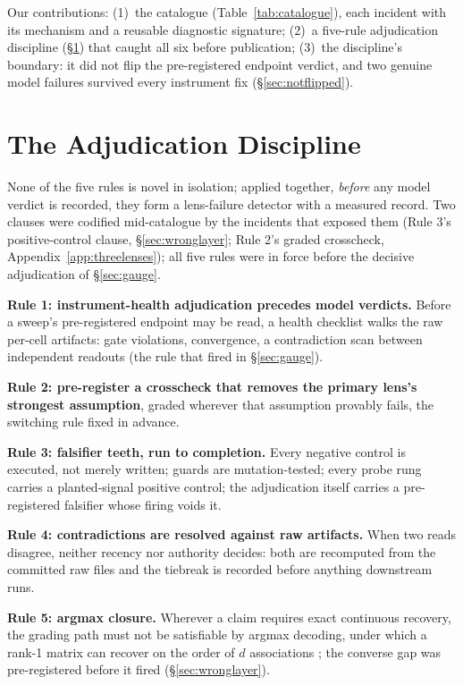 \documentclass{article}
\begin{document}
Our contributions: (1)~the catalogue (Table~\ref{tab:catalogue}), each
incident with its mechanism
and a reusable diagnostic signature; (2)~a five-rule
adjudication discipline (\S\ref{sec:discipline}) that caught all six
before publication; (3)~the discipline's boundary: it did not flip the
pre-registered endpoint verdict, and two genuine model failures
survived every instrument fix (\S\ref{sec:notflipped}).


\section{The Adjudication Discipline}
\label{sec:discipline}

None of the five rules is novel in isolation; applied together,
\emph{before} any model verdict is recorded, they form a lens-failure
detector with a measured record. Two clauses were codified
mid-catalogue by the incidents that exposed them (Rule 3's
positive-control clause, \S\ref{sec:wronglayer}; Rule 2's graded
crosscheck, Appendix~\ref{app:threelenses}); all five rules were in
force before the decisive adjudication of \S\ref{sec:gauge}.

\textbf{Rule 1: instrument-health adjudication precedes model
verdicts.} Before a sweep's pre-registered endpoint may be read, a
health checklist walks the raw per-cell artifacts: gate violations,
convergence, a contradiction scan between independent readouts (the
rule that fired in \S\ref{sec:gauge}).

\textbf{Rule 2: pre-register a crosscheck that removes the primary
lens's strongest assumption}, graded wherever that assumption provably
fails, the switching rule fixed in advance.

\textbf{Rule 3: falsifier teeth, run to completion.} Every negative
control is executed, not merely written; guards are mutation-tested;
every probe rung carries a planted-signal positive control; the
adjudication itself carries a pre-registered falsifier whose firing
voids it.

\textbf{Rule 4: contradictions are resolved against raw artifacts.}
When two reads disagree, neither recency nor authority decides: both
are recomputed from the committed raw files and the tiebreak is
recorded before anything downstream runs.

\textbf{Rule 5: argmax closure.} Wherever a claim requires exact
continuous recovery, the grading path must not be satisfiable by
argmax decoding, under which a rank-1 matrix can recover on the order
of $d$ associations \citep{nichani2025factual}; the converse gap was
pre-registered before it fired (\S\ref{sec:wronglayer}).
\end{document}
